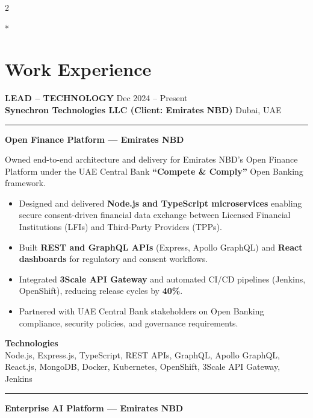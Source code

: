 \documentclass[10pt,a4paper]{article}
\newcommand{\blockdivider}{\vspace{0pt}\color{rulecolor}\rule{\linewidth}{0.5pt}\color{primary}\vspace{4pt}}
\newcommand{\roleheader}[4]{%
  \noindent
  \textbf{\MakeUppercase{#3}}%
  \hfill
  \textcolor{secondary}{#4}\\[0pt]

  \noindent
  \textbf{#1}%
  \hfill
  \textcolor{secondary}{#2}\\[0pt]
}
\newcommand{\roledivider}{%
  \vspace{-1pt}%
  {\color{rulecolor}\rule{\linewidth}{0.5pt}}%
  \vspace{2pt}%
}
\newcommand{\projecttitle}[1]{\textbf{#1}\par\vspace{2pt}}
\begin{document}
\begin{paracol}{2}

\switchcolumn[0]*
\section*{Work Experience}

\roleheader{Synechron Technologies LLC (Client: Emirates NBD)}{Dubai, UAE}{Lead -- Technology}{Dec 2024 -- Present}
\roledivider

\projecttitle{Open Finance Platform — Emirates NBD}

Owned end-to-end architecture and delivery for Emirates NBD's Open Finance Platform under the UAE Central Bank \textbf{``Compete \& Comply''} Open Banking framework.

\begin{itemize}

\item Designed and delivered \textbf{Node.js and TypeScript microservices} enabling secure consent-driven financial data exchange between Licensed Financial Institutions (LFIs) and Third-Party Providers (TPPs).

\item Built \textbf{REST and GraphQL APIs} (Express, Apollo GraphQL) and \textbf{React dashboards} for regulatory and consent workflows.

\item Integrated \textbf{3Scale API Gateway} and automated CI/CD pipelines (Jenkins, OpenShift), reducing release cycles by \textbf{40\%}.

\item Partnered with UAE Central Bank stakeholders on Open Banking compliance, security policies, and governance requirements.

\end{itemize}

\textbf{Technologies}\\
Node.js, Express.js, TypeScript, REST APIs, GraphQL, Apollo GraphQL, React.js, MongoDB, Docker, Kubernetes, OpenShift, 3Scale API Gateway, Jenkins

\blockdivider

\projecttitle{Enterprise AI Platform — Emirates NBD}


\end{paracol}
\end{document}

